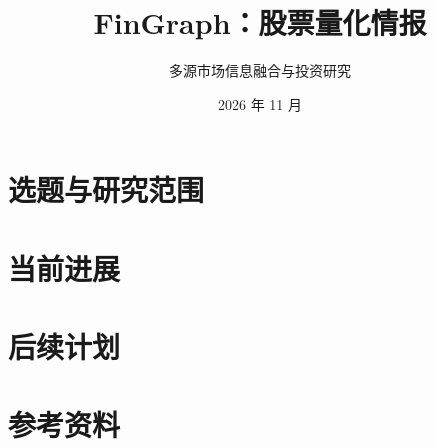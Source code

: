 \documentclass[aspectratio=169,12pt,fontset=none,usepdftitle=false]{ctexbeamer}
\title[股票量化情报]{FinGraph：股票量化情报}
\subtitle{多源市场信息融合与投资研究}
\author[FinGraph]{}
\institute[]{《知识图谱》课程期中汇报}
\date[]{2026 年 11 月}
\begin{document}
\begin{frame}\titlepage\end{frame}
\section{选题与研究范围}


\section{当前进展}







\section{后续计划}


\appendix
\section{参考资料}



\end{document}
